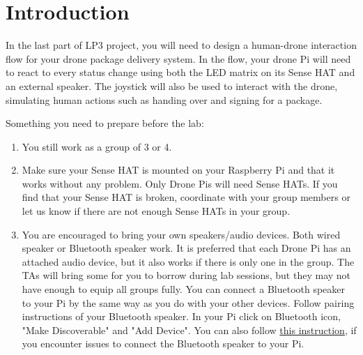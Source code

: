 \documentclass{article}
\begin{document}
\newpage


\section{Introduction}
In the last part of LP3 project, you will need to design a human-drone interaction flow for your drone package delivery system. In the flow, your drone Pi will need to react to every status change using both the LED matrix on its Sense HAT and an external speaker. The joystick will also be used to interact with the drone, simulating human actions such as handing over and signing for a package.

Something you need to prepare before the lab:
\begin{enumerate}
    \item You still work as a group of 3 or 4. 
    \item Make sure your Sense HAT is mounted on your Raspberry Pi and that it works without any problem. Only Drone Pis will need Sense HATs. If you find that your Sense HAT is broken, coordinate with your group members or let us know if there are not enough Sense HATs in your group.
    \item You are encouraged to bring your own speakers/audio devices. Both wired speaker or Bluetooth speaker work. It is preferred that each Drone Pi has an attached audio device, but it also works if there is only one in the group. The TAs will bring some for you to borrow during lab sessions, but they may not have enough to equip all groups fully. You can connect a Bluetooth speaker to your Pi by the same way as you do with your other devices. Follow pairing instructions of your Bluetooth speaker. In your Pi click on Bluetooth icon, "Make Discoverable" and "Add Device".
    You can also follow \textcolor{blue}{\href{https://raspberrydiy.com/connect-raspberry-pi-bluetooth-speaker/}{this instruction}}, if you encounter issues to connect the Bluetooth speaker to your Pi.  
\end{enumerate}
\end{document}

